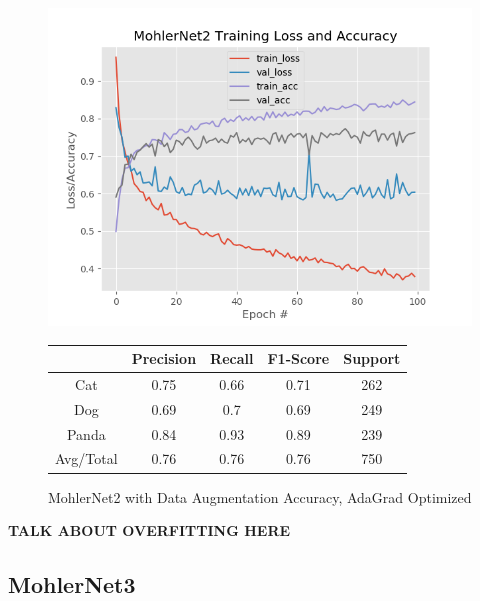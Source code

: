 \documentclass[12pt]{article}
\begin{document}
\begin{figure}[h]
	\centering %
	\captionsetup{justification=centering}
	\begin{minipage}{0.5\textwidth}
		\centering %
		\includegraphics[width=1\textwidth]{MohlerNet2_opt-AdaGradAugment_KEEP.png}
		\caption{MohlerNet2 with Data Augmentation Accuracy, AdaGrad Optimized} \label{MN2Aug}
	\end{minipage}\hfill
	\begin{minipage}{0.5\textwidth}
		\begin{center}
			\begin{tabular}[5pt]{| c| c| c| c|c|}
				\hline
				& Precision & Recall & F1-Score & Support \\[0.5ex] 
				\hline 	
				Cat   &    0.75&	0.66&	0.71&	262\\ \hline 
				Dog    &   0.69&	0.7&	0.69&	249    \\ \hline 
				Panda   &   0.84&	0.93&	0.89&	239    \\ \hline 
				Avg/Total  &    0.76&	0.76&	0.76&	750\\ \hline 
				
			\end{tabular}
			\label{MN2RAug}
		\end{center}	
	\end{minipage}
\end{figure}
\textbf{TALK ABOUT OVERFITTING HERE}
\subsection{MohlerNet3}
\end{document}
